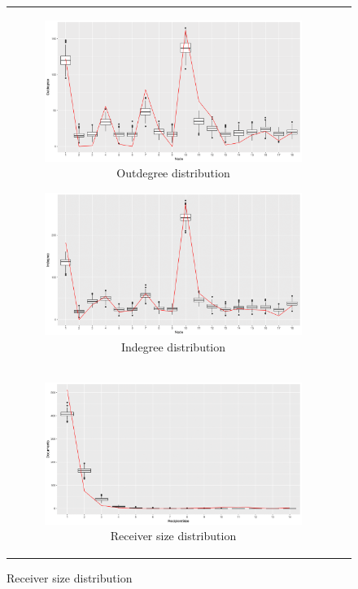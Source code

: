 \documentclass[ba]{imsart}
\numberwithin{equation}{section}
\theoremstyle{plain}
\begin{document}
	\begin{figure}[!htb]
		\centering
		\begin{tabular}[t]{cc}
		   	\begin{subfigure}[b]{0.495\textwidth}
		   		\caption{Outdegree distribution}
		\includegraphics[width=\textwidth]{img/outdegreenew-1.png}	
		   	\end{subfigure}
		   			   	\begin{subfigure}[b]{0.495\textwidth}
		   			   		\caption{Indegree distribution}
		   			   		\includegraphics[width=\textwidth]{img/indegreenew-1.png}	
		   			   	\end{subfigure}\\
			   	\begin{subfigure}[b]{0.495\textwidth}
			   		\caption{Receiver size distribution}
			   		\includegraphics[width=\textwidth]{img/recipientsizenew-1.png}	

\end{subfigure}
\end{tabular}
\end{figure}
\end{document}
